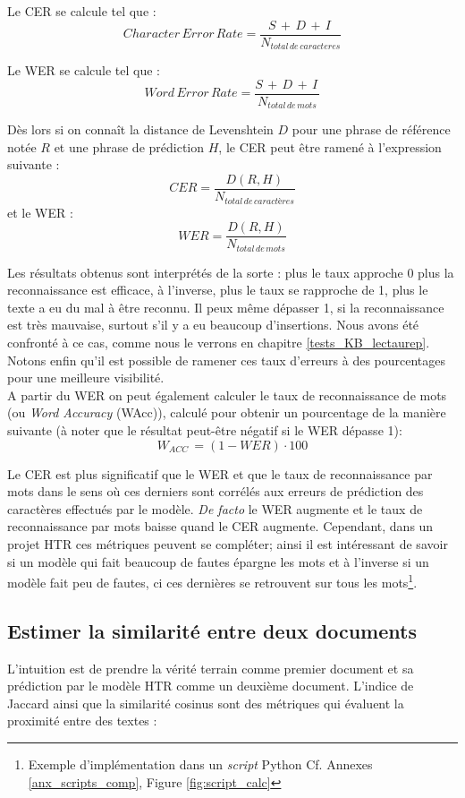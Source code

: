 Le CER se calcule tel que : $$ Character\, Error\, Rate = \frac{S\, + \,D\, + \,I\,}{N_{total\, de\, caracteres}} $$

Le WER se calcule tel que : $$ Word\, Error\, Rate = \frac{S\, + \,D\, + \,I\,}{N_{total\, de\, mots}} $$

Dès lors si on connaît la distance de Levenshtein $D$ pour une phrase de référence notée $R$ et une phrase de prédiction $H$, le CER peut être ramené à l'expression suivante : $$CER = \frac{D(R,H)}{N_{total\, de\, caractères}}$$  et le WER :$$WER = \frac{D(R,H)}{N_{total\, de\, mots}}$$

Les résultats obtenus sont interprétés de la sorte : plus le taux approche 0 plus la reconnaissance est efficace, à l'inverse, plus le taux se rapproche de 1, plus le texte a eu du mal à être reconnu. Il peux même dépasser 1, si la reconnaissance est très mauvaise, surtout s'il y a eu beaucoup d'insertions. Nous avons été confronté à ce cas, comme nous le verrons en chapitre \ref{tests_KB_lectaurep}. Notons enfin qu'il est possible de ramener ces taux d'erreurs à des pourcentages pour une meilleure visibilité.\\

A partir du WER on peut également calculer le taux de reconnaissance de mots (ou \textit{Word Accuracy} (WAcc)), calculé pour obtenir un pourcentage de la manière suivante (à noter que le résultat peut-être négatif si le WER dépasse 1): $$W_{ACC}\, = (1 - WER) \cdot 100  $$

Le CER est plus significatif que le WER et que le taux de reconnaissance par mots dans le sens où ces derniers sont corrélés aux erreurs de prédiction des caractères effectués par le modèle. \textit{De facto} le WER augmente et le taux de reconnaissance par mots baisse quand le CER augmente. Cependant, dans un projet HTR ces métriques peuvent se compléter; ainsi il est intéressant de savoir si un modèle qui fait beaucoup de fautes épargne les mots et à l'inverse si un modèle fait peu de fautes, ci ces dernières se retrouvent sur tous les mots\footnote{Exemple d'implémentation dans un \textit{script} Python Cf. Annexes \ref{anx_scripts_comp}, Figure \ref{fig:script_calc}}.

\subsection{Estimer la similarité entre deux documents}

L'intuition est de prendre la vérité terrain comme premier document et sa prédiction par le modèle HTR comme un deuxième document. L'indice de Jaccard ainsi que la similarité cosinus sont des métriques qui évaluent la proximité entre des textes :\\

